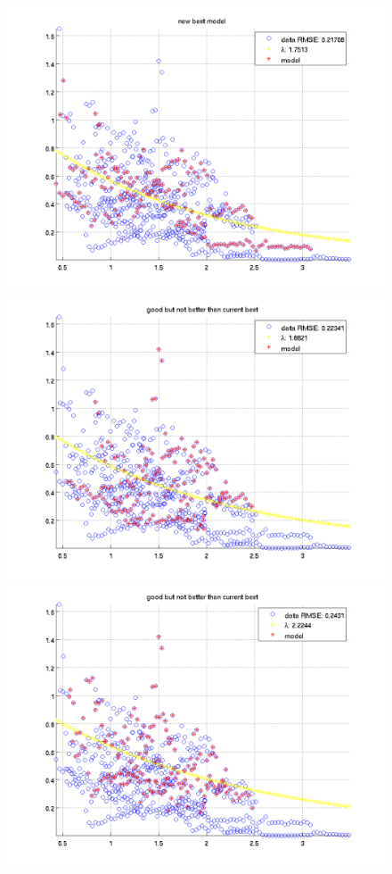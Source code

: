 \documentclass[12pt]{report}
\begin{document}
\newcommand{\imFeatRan}{0.45}
\begin{figure}[H]
\begin{minipage}[t]{0.5\linewidth}
	\centering
	\includegraphics[scale=\imFeatRan]{images/ransac1}\\
	\includegraphics[scale=\imFeatRan]{images/ransac3}\\
	\includegraphics[scale=\imFeatRan]{images/ransac5}\\

\end{minipage}
\end{figure}
\end{document}
